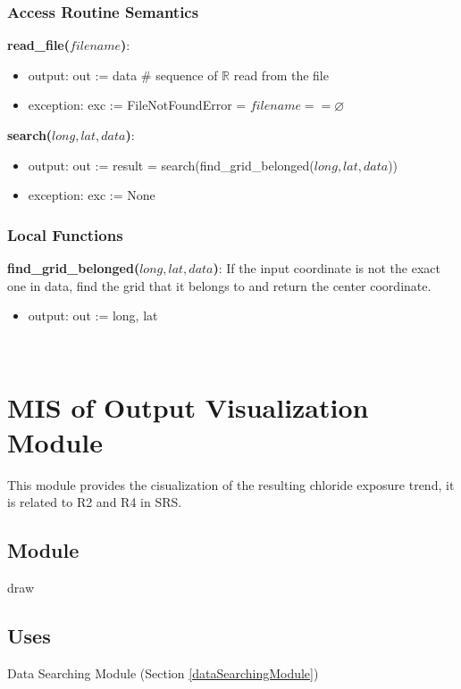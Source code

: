 \documentclass[12pt, titlepage]{article}
\begin{document}
\subsubsection{Access Routine Semantics}
\noindent \textbf{read\_file($filename$)}:
\begin{itemize}
\item output: out := data \# sequence of $\mathbb{R}$ read from the file
\item exception: exc := FileNotFoundError = $filename == \varnothing$
\end{itemize}
\noindent \textbf{search($long, lat, data$)}:
\begin{itemize}
\item output: out := result = search(find\_grid\_belonged($long, lat, data$))
\item exception: exc := None
\end{itemize}

\subsubsection{Local Functions}
\noindent \textbf{find\_grid\_belonged($long, lat, data$)}: If the input coordinate is not the exact one in data, find the grid that it belongs to and return the center coordinate.
\begin{itemize}
\item output: out := long, lat

\end{itemize}


~\newpage

\section{MIS of Output Visualization Module} \label{outputVisualizationModule}
This module provides the cisualization of the resulting chloride exposure trend, it is related to R2 and R4 in SRS.

\subsection{Module}

draw

\subsection{Uses}

Data Searching Module (Section \ref{dataSearchingModule})
\end{document}
